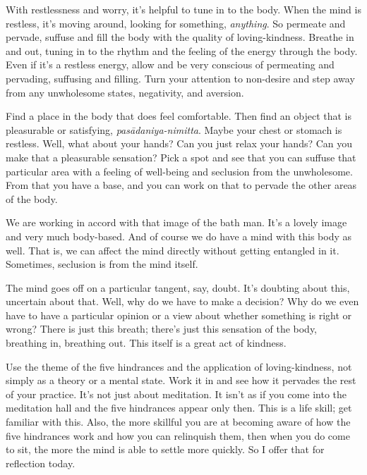 With restlessness and worry, it’s helpful to tune in to the body. When
the mind is restless, it’s moving around, looking for something,
\emph{anything}. So permeate and pervade, suffuse and fill the body with
the quality of loving-kindness. Breathe in and out, tuning in to the
rhythm and the feeling of the energy through the body. Even if it’s a
restless energy, allow and be very conscious of permeating and
pervading, suffusing and filling. Turn your attention to non-desire and
step away from any unwholesome states, negativity, and aversion.

Find a place in the body that does feel comfortable. Then find an object
that is pleasurable or satisfying, \emph{pasādaniya-nimitta}. Maybe your
chest or stomach is restless. Well, what about your hands? Can you just
relax your hands? Can you make that a pleasurable sensation? Pick a spot
and see that you can suffuse that particular area with a feeling of
well-being and seclusion from the unwholesome. From that you have a
base, and you can work on that to pervade the other areas of the body.

We are working in accord with that image of the bath man. It’s a lovely
image and very much body-based. And of course we do have a mind with
this body as well. That is, we can affect the mind directly without
getting entangled in it. Sometimes, seclusion is from the mind itself.

The mind goes off on a particular tangent, say, doubt. It’s doubting
about this, uncertain about that. Well, why do we have to make a
decision? Why do we even have to have a particular opinion or a view
about whether something is right or wrong? There is just this breath;
there’s just this sensation of the body, breathing in, breathing out.
This itself is a great act of kindness.

Use the theme of the five hindrances and the application of
loving-kindness, not simply as a theory or a mental state. Work it in
and see how it pervades the rest of your practice. It’s not just about
meditation. It isn’t as if you come into the meditation hall and the
five hindrances appear only then. This is a life skill; get familiar
with this. Also, the more skillful you are at becoming aware of how the
five hindrances work and how you can relinquish them, then when you do
come to sit, the more the mind is able to settle more quickly. So I
offer that for reflection today.
